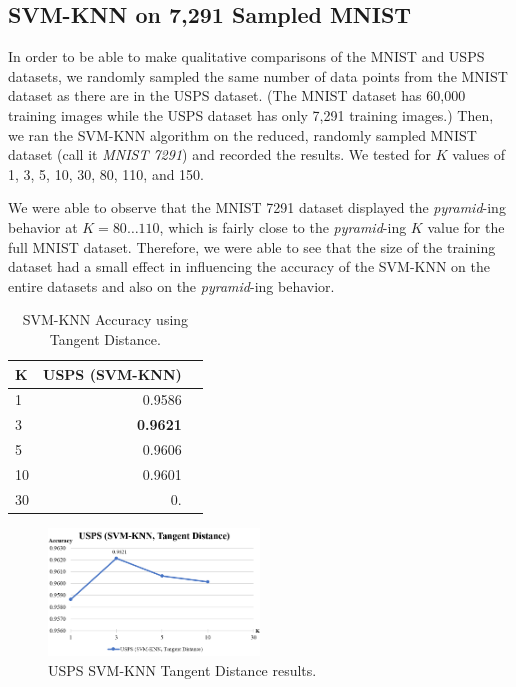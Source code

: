 \documentclass[11pt,letterpaper]{article}
\begin{document}
\subsection{SVM-KNN on 7,291 Sampled MNIST}

In order to be able to make qualitative comparisons of the MNIST and USPS datasets, we randomly sampled the same number of data points from the MNIST dataset as there are in the USPS dataset. (The MNIST dataset has 60,000 training images while the USPS dataset has only 7,291 training images.) Then, we ran the SVM-KNN algorithm on the reduced, randomly sampled MNIST dataset (call it \textit{MNIST 7291}) and recorded the results. We tested for $K$ values of 1, 3, 5, 10, 30, 80, 110, and 150.

We were able to observe that the MNIST 7291 dataset displayed the \textit{pyramid}-ing behavior at $K=80\dots 110$, which is fairly close to the \textit{pyramid}-ing $K$ value for the full MNIST dataset. Therefore, we were able to see that the size of the training dataset had a small effect in influencing the accuracy of the SVM-KNN on the entire datasets and also on the \textit{pyramid}-ing behavior.

\begin{table}
\begin{center}
\begin{tabular}{|l|r|r|}
\hline \bf K & \bf USPS (SVM-KNN) \\ \hline
1 & 0.9586  \\
3 & \textbf{0.9621} \\
5 & 0.9606 \\
10 & 0.9601 \\
30 & 0. \\
\hline
\end{tabular}
\end{center}
\caption{\label{knn-mnist} SVM-KNN Accuracy using Tangent Distance.}
\end{table}

\begin{figure}[t!]
  \centering
  \includegraphics[keepaspectratio, width=0.5\textwidth]{usps_td.png}
  \caption{USPS SVM-KNN Tangent Distance results.}
\end{figure}
\end{document}

